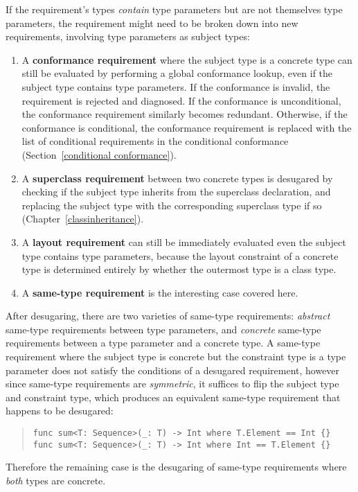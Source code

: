 \documentclass[a4paper,headsepline,bibliography=totoc,toc=flat,fleqn,twoside=semi]{scrbook}
\theoremstyle{definition}
\theoremstyle{definition}
\theoremstyle{definition}
\begin{document}
If the requirement's types \emph{contain} type parameters but are not themselves type parameters, the requirement might need to be broken down into new requirements, involving type parameters as subject types:
\begin{enumerate}
\item A \textbf{conformance requirement} where the subject type is a concrete type can still be evaluated by performing a global conformance lookup, even if the subject type contains type parameters. If the conformance is invalid, the requirement is rejected and diagnosed. If the conformance is unconditional, the conformance requirement similarly becomes redundant. Otherwise, if the conformance is conditional, the conformance requirement is replaced with the list of conditional requirements in the conditional conformance (Section~\ref{conditional conformance}).
\item A \textbf{superclass requirement} between two concrete types is desugared by checking if the subject type inherits from the superclass declaration, and replacing the subject type with the corresponding superclass type if so (Chapter~\ref{classinheritance}).
\item A \textbf{layout requirement} can still be immediately evaluated even the subject type contains type parameters, because the layout constraint of a concrete type is determined entirely by whether the outermost type is a class type.
\item A \textbf{same-type requirement} is the interesting case covered here.
\end{enumerate}
After desugaring, there are two varieties of same-type requirements: \emph{abstract} same-type requirements between type parameters, and \emph{concrete} same-type requirements between a type parameter and a concrete type. A same-type requirement where the subject type is concrete but the constraint type is a type parameter does not satisfy the conditions of a desugared requirement, however since same-type requirements are \emph{symmetric}, it suffices to flip the subject type and constraint type, which produces an equivalent same-type requirement that happens to be desugared:
\begin{quote}
\begin{Verbatim}
func sum<T: Sequence>(_: T) -> Int where T.Element == Int {}
func sum<T: Sequence>(_: T) -> Int where Int == T.Element {}
\end{Verbatim}
\end{quote}
Therefore the remaining case is the desugaring of same-type requirements where \emph{both} types are concrete. 
\end{document}
